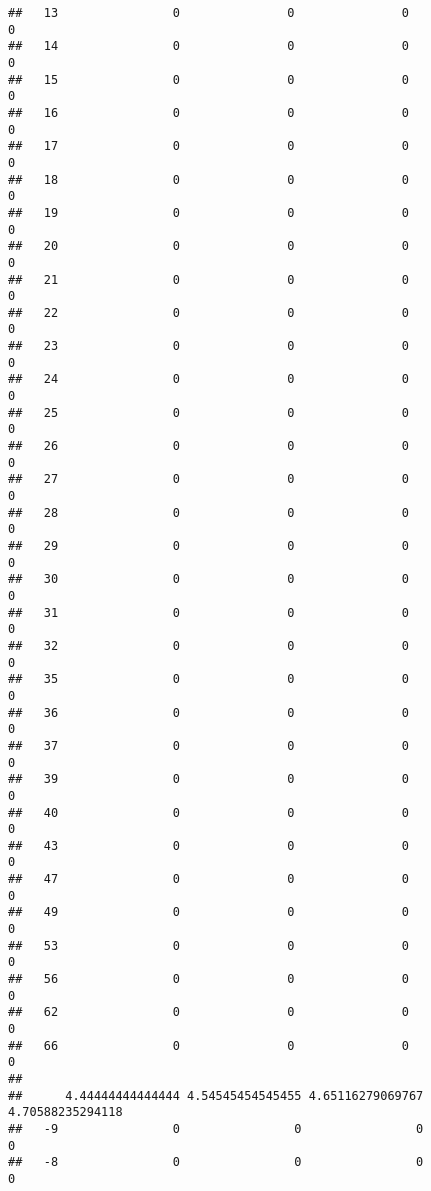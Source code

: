 \documentclass[]{article}
\begin{document}
\begin{verbatim}
##   13                0               0               0                0
##   14                0               0               0                0
##   15                0               0               0                0
##   16                0               0               0                0
##   17                0               0               0                0
##   18                0               0               0                0
##   19                0               0               0                0
##   20                0               0               0                0
##   21                0               0               0                0
##   22                0               0               0                0
##   23                0               0               0                0
##   24                0               0               0                0
##   25                0               0               0                0
##   26                0               0               0                0
##   27                0               0               0                0
##   28                0               0               0                0
##   29                0               0               0                0
##   30                0               0               0                0
##   31                0               0               0                0
##   32                0               0               0                0
##   35                0               0               0                0
##   36                0               0               0                0
##   37                0               0               0                0
##   39                0               0               0                0
##   40                0               0               0                0
##   43                0               0               0                0
##   47                0               0               0                0
##   49                0               0               0                0
##   53                0               0               0                0
##   56                0               0               0                0
##   62                0               0               0                0
##   66                0               0               0                0
##     
##      4.44444444444444 4.54545454545455 4.65116279069767 4.70588235294118
##   -9                0                0                0                0
##   -8                0                0                0                0

\end{verbatim}
\end{document}

